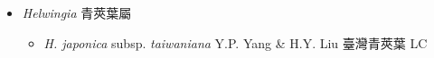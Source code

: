 
  \begin{itemize}
 \item[] \textit{Helwingia} 青莢葉屬
                                
  \begin{itemize}
        \item[] \textit{H. japonica} subsp. \textit{taiwaniana} Y.P. Yang \& H.Y. Liu  臺灣青莢葉   LC
  \end{itemize}
  \end{itemize}
